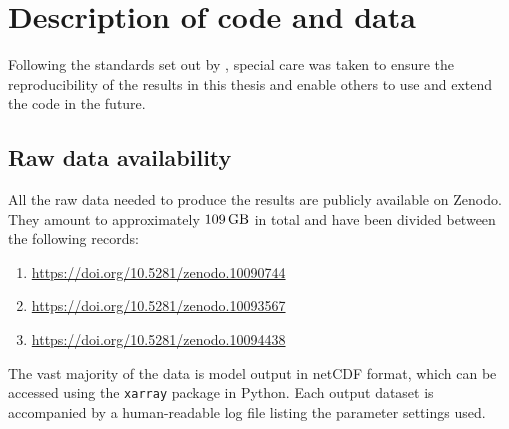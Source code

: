 \documentclass[../main.tex]{subfiles}
\begin{document}
\ifSubfilesClassLoaded{
    \frontmatter
    \tableofcontents
    \mainmatter
}{}

\appendix
\chapter{Description of code and data} \label{chap:computations}
Following the standards set out by \textcite{irving2018}, special care was
taken to ensure the reproducibility of the results in this thesis and enable
others to use and extend the code in the future.

\section{Raw data availability}
All the raw data needed to produce the results are publicly available on
Zenodo. They amount to approximately $\SI{109}{\giga\byte}$ in total and
have been divided between the following records:
\begin{enumerate}
    \item \url{https://doi.org/10.5281/zenodo.10090744}
    \item \url{https://doi.org/10.5281/zenodo.10093567}
    \item \url{https://doi.org/10.5281/zenodo.10094438}
\end{enumerate}
The vast majority of the data is model output in netCDF format, which can
be accessed using the \texttt{xarray} package in Python. Each output dataset
is accompanied by a human-readable log file listing the parameter settings
used.
\end{document}
